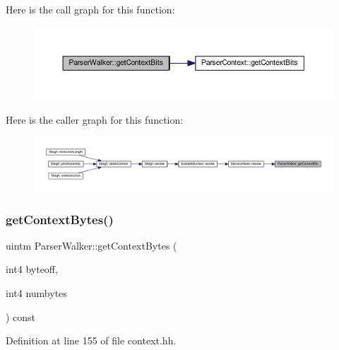 Here is the call graph for this function\+:
\nopagebreak
\begin{figure}[H]
\begin{center}
\leavevmode
\includegraphics[width=350pt]{class_parser_walker_ae38ea0339696eeeec219b3d36d35e5ac_cgraph}
\end{center}
\end{figure}
Here is the caller graph for this function\+:
\nopagebreak
\begin{figure}[H]
\begin{center}
\leavevmode
\includegraphics[width=350pt]{class_parser_walker_ae38ea0339696eeeec219b3d36d35e5ac_icgraph}
\end{center}
\end{figure}
\mbox{\label{class_parser_walker_a630fe457e1473666fcad37cbba63b9a5}} 
\subsubsection{\texorpdfstring{getContextBytes()}{getContextBytes()}}
{\footnotesize\ttfamily uintm Parser\+Walker\+::get\+Context\+Bytes (\begin{DoxyParamCaption}\item[{int4}]{byteoff,  }\item[{int4}]{numbytes }\end{DoxyParamCaption}) const\hspace{0.3cm}{\ttfamily [inline]}}



Definition at line 155 of file context.\+hh.

